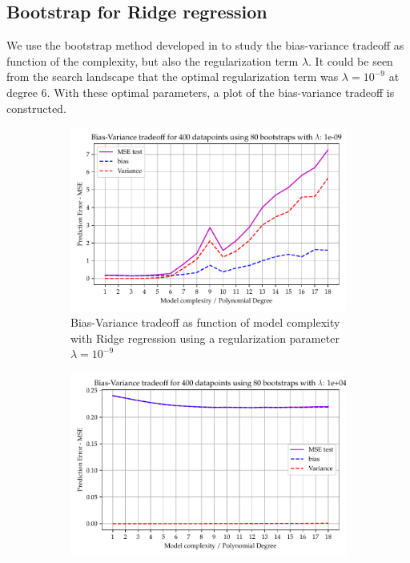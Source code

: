 \documentclass[11pt, a4paper]{article}
\begin{document}
\subsection*{Bootstrap for Ridge regression}
We use the bootstrap method developed in  to study the bias-variance tradeoff as function of the complexity, but also the regularization term $\lambda$. It could be seen from the search landscape that the optimal regularization term was $\lambda = 10^{-9}$ at degree 6. With these optimal parameters, a plot of the bias-variance tradeoff is constructed.

\begin{figure}
  \centering
  \begin{subfigure}{0.49\textwidth}
      \centering
      \includegraphics[width=\textwidth]{figures/EX4_ridge_complexity_using_bootstrap_function_lmb200.pdf}
      \caption{\label{fig:ridge_beta_1}Bias-Variance tradeoff as function of model complexity with Ridge regression using a regularization parameter $\lambda = 10^{-9}$}
  \end{subfigure}
  \hfill
  \begin{subfigure}{0.49\textwidth}
      \centering
      \includegraphics[width=\textwidth]{figures/EX4_ridge_complexity_using_bootstrap_function_lmb2013.pdf}

\end{subfigure}
\end{figure}
\end{document}
